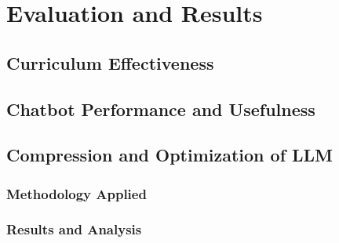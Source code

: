 \chapter{Evaluation and Results}

\section{Curriculum Effectiveness}

\section{Chatbot Performance and Usefulness}

\section{Compression and Optimization of LLM}
    \subsection{Methodology Applied}

    \subsection{Results and Analysis}